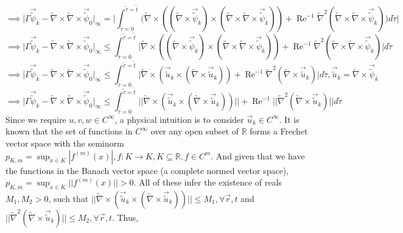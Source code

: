 \documentclass{article}
\begin{document}
\begin{equation*}
\implies \bigg|\Gamma \vec{\tilde{\psi}}_k - \tilde{\nabla}\times\tilde{\nabla}\times\vec{\tilde{\psi}}_0\bigg|_{\infty} = \bigg|\int_{\tilde{\tau} = 0}^{\tilde{\tau} = \tilde{t}} \bigg(\tilde{\nabla} \times ((\tilde{\nabla} \times \vec{\tilde{\psi}}_k)\times(\tilde{\nabla} \times \tilde{\nabla} \times \vec{\tilde{\psi}}_k)) + \operatorname{Re}^{-1} \tilde{\nabla}^2(\tilde{\nabla}\times\tilde{\nabla}\times\vec{\tilde{\psi}}_k) \bigg)d\tilde{\tau}\bigg|
\end{equation*}
\begin{equation*}
\implies \bigg|\Gamma \vec{\tilde{\psi}}_k - \tilde{\nabla}\times\tilde{\nabla}\times\vec{\tilde{\psi}}_0\bigg|_{\infty} \le \int_{\tilde{\tau} = 0}^{\tilde{\tau} = \tilde{t}} \bigg|\tilde{\nabla} \times ((\tilde{\nabla} \times \vec{\tilde{\psi}}_k)\times(\tilde{\nabla} \times \tilde{\nabla} \times \vec{\tilde{\psi}}_k)) + \operatorname{Re}^{-1} \tilde{\nabla}^2(\tilde{\nabla}\times\tilde{\nabla}\times\vec{\tilde{\psi}}_k) \bigg|d\tilde{\tau}
\end{equation*}
\begin{equation*}
\implies \bigg|\Gamma \vec{\tilde{\psi}}_k - \tilde{\nabla}\times\tilde{\nabla}\times\vec{\tilde{\psi}}_0\bigg|_{\infty} \le \int_{\tilde{\tau} = 0}^{\tilde{\tau} = \tilde{t}} \bigg|\tilde{\nabla} \times (\vec{\tilde{u}}_k\times(\tilde{\nabla} \times \vec{\tilde{u}}_k)) + \operatorname{Re}^{-1} \tilde{\nabla}^2(\tilde{\nabla}\times\vec{\tilde{u}}_k) \bigg|d\tilde{\tau}, \vec{\tilde{u}}_k = \tilde{\nabla} \times \vec{\tilde{\psi}}_k
\end{equation*}
\begin{equation*}
\implies \bigg|\Gamma \vec{\tilde{\psi}}_k - \tilde{\nabla}\times\tilde{\nabla}\times\vec{\tilde{\psi}}_0\bigg|_{\infty} \le \int_{\tilde{\tau} = 0}^{\tilde{\tau} = \tilde{t}} \bigg|\bigg|\tilde{\nabla} \times (\vec{\tilde{u}}_k\times(\tilde{\nabla} \times \vec{\tilde{u}}_k))\bigg|\bigg| + \operatorname{Re}^{-1} \bigg|\bigg|\tilde{\nabla}^2(\tilde{\nabla}\times\vec{\tilde{u}}_k)\bigg|\bigg|d\tilde{\tau}
\end{equation*}
Since we require $u, v, w \in C^{\infty}$, a physical intuition is to consider $\vec{u}_k \in C^{\infty}$. It is known that the set of functions in $C^{\infty}$ over any open subset of $\mathbb{R}$ forms a Frechet vector space with the seminorm $p_{K, m} = \sup_{x \in K} |f^{(m)}(x)|, f:K\to K, K \subseteq \mathbb{R}, f \in C^m$. And given that we have the functions in the Banach vector space (a complete normed vector space), $p_{K, m} = \sup_{x \in K} ||f^{(m)}(x)||>0$. All of these infer the existence of reals $M_1, M_2 > 0$, such that $\bigg|\bigg|\tilde{\nabla} \times (\vec{\tilde{u}}_k\times(\tilde{\nabla} \times \vec{\tilde{u}}_k))\bigg|\bigg| \le M_1, \forall \vec{r}, t$ and $\bigg|\bigg|\tilde{\nabla}^2(\tilde{\nabla}\times\vec{\tilde{u}}_k)\bigg|\bigg| \le M_2, \forall \vec{r}, t$. Thus,
\end{document}
